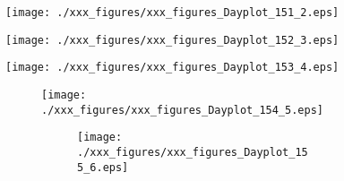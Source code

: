 \vspace{1cm}
\begin{figure}[hbtp!]
\begin{center}   
     \texttt{[image: ./xxx\_figures/xxx\_figures\_Dayplot\_151\_2.eps]}
	   \label{fig:GlobalPlot}
\end{center}
\end{figure}
%
\vspace{1cm}
\begin{figure}[hbtp!]
\begin{center}   
     \texttt{[image: ./xxx\_figures/xxx\_figures\_Dayplot\_152\_3.eps]}
	   \label{fig:GlobalPlot}
\end{center}
\end{figure}
\vspace{1cm}
\begin{figure}[hbtp!]
\begin{center}   
     \texttt{[image: ./xxx\_figures/xxx\_figures\_Dayplot\_153\_4.eps]}
	   \label{fig:GlobalPlot}
\end{center}

\vspace{1cm}
\begin{figure}[hbtp!]
\begin{center}   
     \texttt{[image: ./xxx\_figures/xxx\_figures\_Dayplot\_154\_5.eps]}
	   \label{fig:GlobalPlot}
\end{center}

\vspace{1cm}
\begin{figure}[hbtp!]
\begin{center}   
     \texttt{[image: ./xxx\_figures/xxx\_figures\_Dayplot\_155\_6.eps]}
	   \label{fig:GlobalPlot}
\end{center}
\end{figure}
\end{figure}
\end{figure}